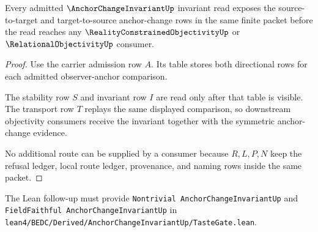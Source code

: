 \begin{theorem}
\label{thm:anchor-change-invariant-anchor-symmetry-totality}
Every admitted $\AnchorChangeInvariantUp$ invariant read exposes the source-to-target and target-to-source anchor-change rows in the same finite packet before the read reaches any $\RealityConstrainedObjectivityUp$ or $\RelationalObjectivityUp$ consumer.
\end{theorem}
\begin{proof}
Use the carrier admission row $A$. Its table stores both directional rows for each admitted observer-anchor comparison.

The stability row $S$ and invariant row $I$ are read only after that table is visible. The transport row $T$ replays the same displayed comparison, so downstream objectivity consumers receive the invariant together with the symmetric anchor-change evidence.

No additional route can be supplied by a consumer because $R,L,P,N$ keep the refusal ledger, local route ledger, provenance, and naming rows inside the same packet.
\end{proof}



The Lean follow-up must provide \texttt{Nontrivial AnchorChangeInvariantUp} and \texttt{FieldFaithful AnchorChangeInvariantUp} in \texttt{lean4/BEDC/Derived/AnchorChangeInvariantUp/TasteGate.lean}.


